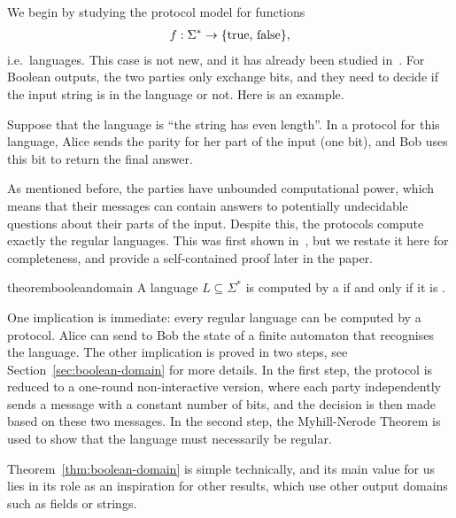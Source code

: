 We begin by studying the protocol model for  functions
\begin{align*}
f : \Sigma^* \to \{\text{true, false}\},
\end{align*}
i.e.~languages. This case is not new, and it has already been studied in~\cite{hauser1989}. For Boolean outputs, the two parties only exchange bits, 
and they need to decide if the input string is in the language or not.
Here is an example.

\begin{myexample}[Parity]
    \label{ex:three-letters}
Suppose that the language is ``the string has even length''. In a protocol for this language, Alice sends the parity for her part of the input (one bit), and Bob uses this bit to return the final answer.  
\end{myexample}

As mentioned before, the parties have unbounded computational power, which means that  their messages
can contain answers to potentially undecidable questions about their parts of the input.
Despite this, the protocols compute exactly the regular languages.
This was first shown in~\cite[Theorem 5]{hauser1989}, but we restate it here for completeness, and provide a self-contained proof later in the paper.

\begin{restatable}{theorem}{booleandomain}
 \label{thm:boolean-domain} A language $L \subseteq \Sigma^*$ is computed by a  if and only if it is 
 .
\end{restatable}
One implication is immediate: every regular language can be computed by a protocol.  Alice can send to Bob the state of a finite automaton that recognises the language. The other implication is proved in two steps, see Section~\ref{sec:boolean-domain} for more details. In the first step, the protocol is reduced to a one-round non-interactive version, where each party independently sends a message with a constant number of bits, and the decision is then made based on these two messages. In the second step,  the Myhill-Nerode Theorem is used to show that the language must necessarily be regular. 

Theorem~\ref{thm:boolean-domain} is  simple  technically, and its main value for us lies in its role as an inspiration for other results, which use  other output domains  such as  fields or strings. 


